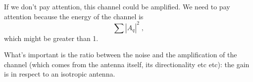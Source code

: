 \documentclass[a4paper, 12pt]{book}
\begin{document}
If we don't pay attention, this channel could be amplified. We need to pay attention because the energy of the channel is
$$
\sum |A_q|^2 \;,
$$
which might be greater than 1.

\begin{tcolorbox}[sharp corners, boxrule=0pt, leftrule=2pt, colframe=green!60!black, colback=green!5, left=5pt, top=3pt, bottom=3pt]
    What's important is the ratio between the noise and the amplification of the channel (which comes from the antenna itself, its directionality etc etc): the gain is in respect to an isotropic antenna.
\end{tcolorbox}
\end{document}
